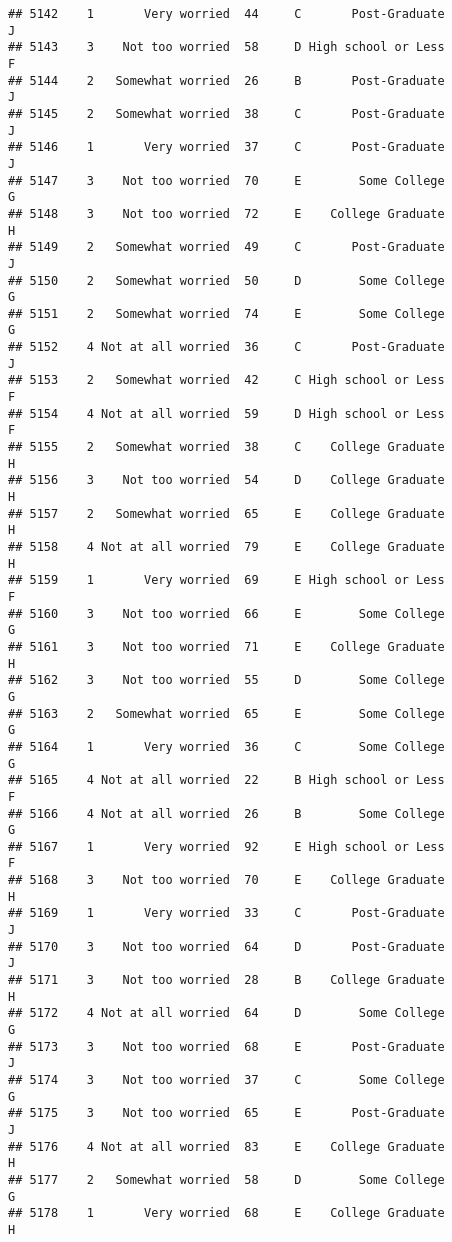 \documentclass[
]{article}
\begin{document}
\begin{verbatim}
## 5142    1       Very worried  44     C       Post-Graduate         J
## 5143    3    Not too worried  58     D High school or Less         F
## 5144    2   Somewhat worried  26     B       Post-Graduate         J
## 5145    2   Somewhat worried  38     C       Post-Graduate         J
## 5146    1       Very worried  37     C       Post-Graduate         J
## 5147    3    Not too worried  70     E        Some College         G
## 5148    3    Not too worried  72     E    College Graduate         H
## 5149    2   Somewhat worried  49     C       Post-Graduate         J
## 5150    2   Somewhat worried  50     D        Some College         G
## 5151    2   Somewhat worried  74     E        Some College         G
## 5152    4 Not at all worried  36     C       Post-Graduate         J
## 5153    2   Somewhat worried  42     C High school or Less         F
## 5154    4 Not at all worried  59     D High school or Less         F
## 5155    2   Somewhat worried  38     C    College Graduate         H
## 5156    3    Not too worried  54     D    College Graduate         H
## 5157    2   Somewhat worried  65     E    College Graduate         H
## 5158    4 Not at all worried  79     E    College Graduate         H
## 5159    1       Very worried  69     E High school or Less         F
## 5160    3    Not too worried  66     E        Some College         G
## 5161    3    Not too worried  71     E    College Graduate         H
## 5162    3    Not too worried  55     D        Some College         G
## 5163    2   Somewhat worried  65     E        Some College         G
## 5164    1       Very worried  36     C        Some College         G
## 5165    4 Not at all worried  22     B High school or Less         F
## 5166    4 Not at all worried  26     B        Some College         G
## 5167    1       Very worried  92     E High school or Less         F
## 5168    3    Not too worried  70     E    College Graduate         H
## 5169    1       Very worried  33     C       Post-Graduate         J
## 5170    3    Not too worried  64     D       Post-Graduate         J
## 5171    3    Not too worried  28     B    College Graduate         H
## 5172    4 Not at all worried  64     D        Some College         G
## 5173    3    Not too worried  68     E       Post-Graduate         J
## 5174    3    Not too worried  37     C        Some College         G
## 5175    3    Not too worried  65     E       Post-Graduate         J
## 5176    4 Not at all worried  83     E    College Graduate         H
## 5177    2   Somewhat worried  58     D        Some College         G
## 5178    1       Very worried  68     E    College Graduate         H

\end{verbatim}
\end{document}
